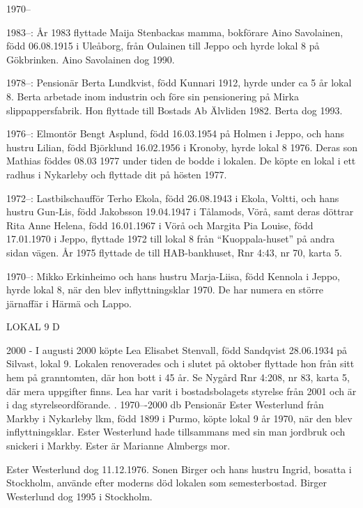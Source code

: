  1970--

1983--: År 1983 flyttade Maija Stenbackas mamma, bokförare Aino Savolainen, född 06.08.1915 i Uleåborg, från Oulainen till Jeppo och hyrde lokal 8 på Gökbrinken. Aino Savolainen dog 1990.

1978--: Pensionär Berta Lundkvist, född Kunnari 1912, hyrde under ca 5 år lokal 8. Berta arbetade inom industrin och före sin pensionering på Mirka slippappersfabrik. Hon flyttade till Bostads Ab Älvliden 1982. Berta dog 1993.

1976--: Elmontör Bengt Asplund, född 16.03.1954 på Holmen i Jeppo, och hans hustru Lilian, född Björklund 16.02.1956 i Kronoby, hyrde lokal 8 1976. Deras son Mathias föddes 08.03 1977 under tiden de bodde i lokalen. De köpte en lokal i ett radhus i Nykarleby och flyttade dit på hösten 1977.

1972--: Lastbilschaufför Terho Ekola, född 26.08.1943 i Ekola, Voltti, och hans hustru Gun-Lis, född Jakobsson 19.04.1947 i Tålamods, Vörå, samt deras döttrar Rita Anne Helena, född 16.01.1967 i Vörå och Margita Pia Louise, född 17.01.1970 i Jeppo, flyttade 1972 till lokal 8 från ``Kuoppala-huset'' på andra sidan vägen. År 1975 flyttade de till HAB-bankhuset, Rnr 4:43, nr 70, karta 5.

1970--: Mikko Erkinheimo och hans hustru Marja-Liisa, född Kennola i Jeppo, hyrde lokal 8, när den blev inflyttningsklar 1970. De har numera en större järnaffär i Härmä och Lappo.


LOKAL 9 D

 2000 -
I augusti 2000 köpte Lea Elisabet Stenvall, född Sandqvist 28.06.1934 på Silvast, lokal 9. Lokalen renoverades och i slutet på oktober flyttade hon från sitt hem på granntomten, där hon bott i 45 år. Se Nygård Rnr 4:208, nr 83, karta 5, där mera uppgifter finns. Lea har varit i bostadsbolagets styrelse från 2001 och är i dag styrelseordförande.
		.
 1970---2000 db
Pensionär Ester Westerlund från Markby i Nykarleby lkm, född 1899 i Purmo, köpte lokal 9 år 1970, när den blev inflyttningsklar. Ester Westerlund hade tillsammans med sin man jordbruk och snickeri i Markby. Ester är Marianne Almbergs mor.

Ester Westerlund dog 11.12.1976. Sonen Birger och hans hustru Ingrid, bosatta i Stockholm, använde efter moderns död lokalen som semesterbostad. Birger Westerlund dog 1995 i Stockholm.


